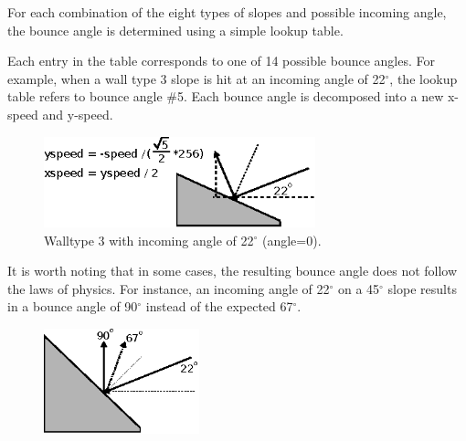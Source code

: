 \documentclass[book.tex]{subfiles}
\begin{document}
\par
\begin{minipage}{\textwidth}
  
\end{minipage}

\par
For each combination of the eight types of slopes and possible incoming angle, the bounce angle is determined using a simple lookup table. \\

\par
\begin{minipage}{\textwidth}
  
\end{minipage}

\par
Each entry in the table corresponds to one of 14 possible bounce angles. For example, when a wall type 3 slope is hit at an incoming angle of 22$^{\circ}$, the lookup table refers to bounce angle \#5. Each bounce angle is decomposed into a new x-speed and y-speed.\\


\par
\begin{figure}[H]
\centering
\includegraphics[width=0.7\textwidth]{imgs/drawings/bounce_angle.eps}
\caption{Walltype 3 with incoming angle of 22$^{\circ}$ (angle=0).}
\label{fig:bounce_angles}
\end{figure}
\par

\begin{minipage}{\textwidth}
  
\end{minipage}

\par
It is worth noting that in some cases, the resulting bounce angle does not follow the laws of physics. For instance, an incoming angle of 22$^{\circ}$ on a 45$^{\circ}$ slope results in a bounce angle of 90$^{\circ}$ instead of the expected 67$^{\circ}$.\\

\par
\begin{figure}[H]
\centering
\includegraphics[width=0.4\textwidth]{imgs/drawings/bounce_physics.eps}
\end{figure}
\par
\end{document}
